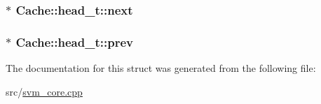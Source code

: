 \subsubsection[{next}]{ $\ast$ Cache\+::head\+\_\+t\+::next}\hypertarget{structCache_1_1head__t_aa152a104ec07250949c234d164f5f3fd}{}\label{structCache_1_1head__t_aa152a104ec07250949c234d164f5f3fd}
\subsubsection[{prev}]{$\ast$ Cache\+::head\+\_\+t\+::prev}\hypertarget{structCache_1_1head__t_a82b1a4d1a105769f85cce8d51c19860e}{}\label{structCache_1_1head__t_a82b1a4d1a105769f85cce8d51c19860e}


The documentation for this struct was generated from the following file\+:\begin{DoxyCompactItemize}
\item 
src/\hyperlink{svm__core_8cpp}{svm\+\_\+core.\+cpp}\end{DoxyCompactItemize}
